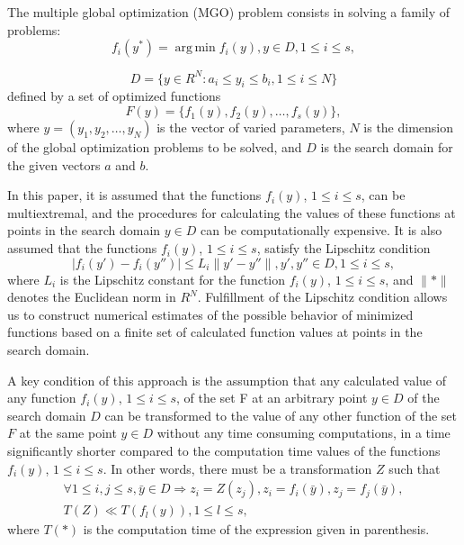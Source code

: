 \documentclass[review]{elsarticle}
\DeclareMathOperator*{\argmin}{arg\,min}
\begin{document}
The multiple global optimization (MGO) problem consists in solving a family of problems:
\begin{equation}\label{eq:1}
f_i(y^*) = \argmin f_i(y), y \in D, 1 \leq i \leq s,
\end{equation}

\begin{equation}\label{eq:2}
D  = \{ y\in R^N: a_i \leq y_i \leq b_i, 1 \leq i \leq N \}
\end{equation}
defined by a set of optimized functions
\begin{equation}\label{eq:3}
F(y) = \{ f_1(y),  f_2(y),\dots, f_s(y) \},
\end{equation}
where $y = (y_1,y_2,\dots,y_N)$ is the vector of varied parameters, $N$ is the dimension of the global optimization problems to be solved, and $D$ is the search domain for the given vectors $a$ and $b$. 

In this paper, it is assumed that the functions $f_i(y)$, $1 \leq i \leq s$, can be multiextremal, and the procedures for calculating the values of these functions at points in the search domain $y \in D$ can be computationally expensive. It is also assumed that the functions $f_i(y)$, $1 \leq i \leq s$, satisfy the Lipschitz condition
\begin{equation}\label{eq:4}
|f_i (y')-f_i (y'')| \leq L_i \|y'-y''\|, y',y''\in D, 1 \leq i \leq s,
\end{equation}
where $L_i$ is the Lipschitz constant for the function $f_i(y)$, $1 \leq i \leq s$, and ${\|*\|}$ denotes the Euclidean norm in $R^N$. Fulfillment of the Lipschitz condition allows us to construct numerical estimates of the possible behavior of minimized functions based on a finite set of calculated function values at points in the search domain.


A key condition of this approach is the assumption that any calculated value of any function $f_i(y)$, $1 \leq i \leq s$, of the set F at an arbitrary point $y \in D$ of the search domain $D$ can be transformed to the value of any other function of the set $F$ at the same point $y \in D$ without any time consuming computations, in a time significantly shorter compared to the computation time values of the functions $f_i(y)$, $1 \leq i \leq s$. In other words, there must be a transformation $Z$ such that
\begin{equation}\label{eq:5}
\begin{matrix}
\forall 1 \leq i, j \leq s, \bar{y} \in D \Rightarrow z_i=Z(z_j ), z_i = f_i (\bar{y}),z_j=f_j (\bar{y}), \\
T(Z) \ll T(f_l (y) ),1 \leq l \leq s,
\end{matrix}
\end{equation}
where $T(*)$  is the computation time of the expression given in parenthesis.
\end{document}
